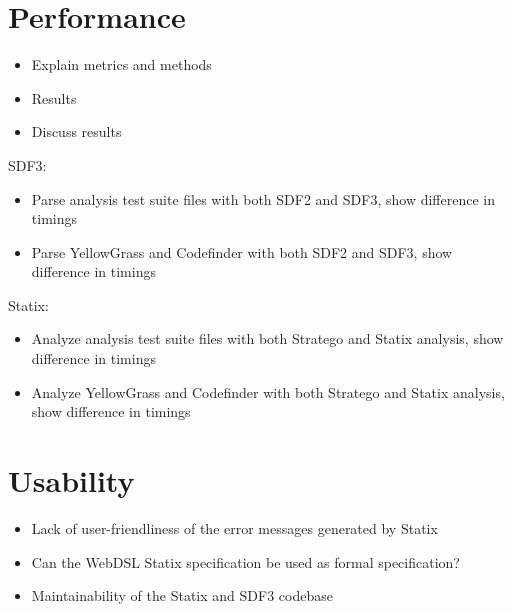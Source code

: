 \section{\label{sec:performance}Performance}

  \begin{itemize}
    \item Explain metrics and methods
    \item Results
    \item Discuss results
  \end{itemize}

  SDF3:

  \begin{itemize}
    \item Parse analysis test suite files with both SDF2 and SDF3, show difference in timings
    \item Parse YellowGrass and Codefinder with both SDF2 and SDF3, show difference in timings
  \end{itemize}

  Statix:

  \begin{itemize}
    \item Analyze analysis test suite files with both Stratego and Statix analysis, show difference in timings
    \item Analyze YellowGrass and Codefinder with both Stratego and Statix analysis, show difference in timings
  \end{itemize}

\section{\label{sec:usability}Usability}

  \begin{itemize}
    \item Lack of user-friendliness of the error messages generated by Statix
    \item Can the WebDSL Statix specification be used as formal specification?
    \item Maintainability of the Statix and SDF3 codebase
  \end{itemize}

